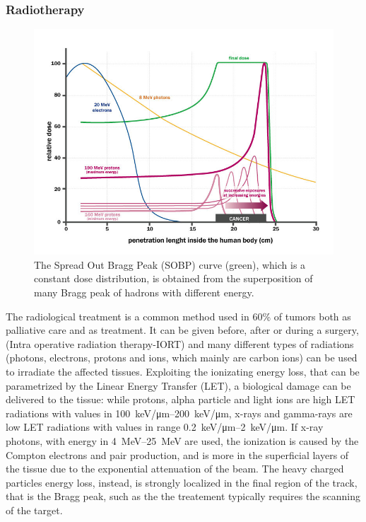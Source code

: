         \subsubsection{Radiotherapy}
            \begin{figure}
                \centering
                \includegraphics[width=.7\linewidth]{figures/pixel_detectors_usage/Bragg-Peak.png}
                \caption{The Spread Out Bragg Peak (SOBP) curve (green), which is a constant dose distribution, is obtained from the superposition of many Bragg peak of hadrons with different energy.}
                \label{fig:Bragg-peak}
            \end{figure}
            The radiological treatment is a common method used in 60\% of tumors both as palliative care and as treatment. It can be given before, after or during a surgery, (Intra operative radiation therapy-IORT) and many different types of radiations (photons, electrons, protons and ions, which mainly are carbon ions) can be used to irradiate the affected tissues.
            Exploiting the ionizating energy loss, that can be parametrized by the Linear Energy Transfer (LET), a biological damage can be delivered to the tissue: while protons, alpha particle and light ions are high LET radiations with values in \SIrange{100}{200}{keV/\um}, x-rays and gamma-rays are low LET radiations with values in range \SIrange{0.2}{2}{keV/\um}.
            If x-ray photons, with energy in \SIrange{4}{25}{MeV} are used, the ionization is caused by the Compton electrons and pair production, and is more in the superficial layers of the tissue due to the exponential attenuation of the beam. 
            The heavy charged particles energy loss, instead, is strongly localized in the final region of the track, that is the Bragg peak, such as the the treatement typically requires the scanning of the target.
            
